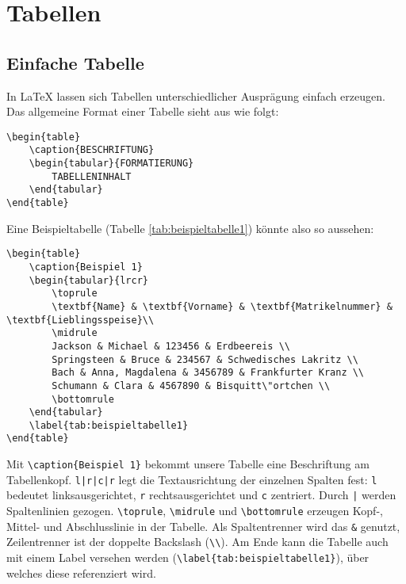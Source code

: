 
\section{Tabellen}
\label{sec:Tabellen}

\subsection{Einfache Tabelle}
In LaTeX lassen sich Tabellen unterschiedlicher Ausprägung einfach erzeugen. Das allgemeine Format einer Tabelle sieht aus wie folgt:

\begin{lstlisting}[caption={Allgemeines Format}]
\begin{table}
	\caption{BESCHRIFTUNG}
	\begin{tabular}{FORMATIERUNG}
		TABELLENINHALT
	\end{tabular}
\end{table}
\end{lstlisting}

Eine Beispieltabelle (Tabelle \ref{tab:beispieltabelle1}) könnte also so aussehen:

\begin{lstlisting}[caption={Tabelle \ref{tab:beispieltabelle1}}]
\begin{table}
	\caption{Beispiel 1}
	\begin{tabular}{lrcr}
		\toprule
		\textbf{Name} & \textbf{Vorname} & \textbf{Matrikelnummer} & \textbf{Lieblingsspeise}\\
		\midrule
		Jackson & Michael & 123456 & Erdbeereis \\
		Springsteen & Bruce & 234567 & Schwedisches Lakritz \\
		Bach & Anna, Magdalena & 3456789 & Frankfurter Kranz \\
		Schumann & Clara & 4567890 & Bisquitt\"ortchen \\
		\bottomrule
	\end{tabular}
	\label{tab:beispieltabelle1}
\end{table}
\end{lstlisting}

Mit \lstinline|\caption{Beispiel 1}| bekommt unsere Tabelle eine Beschriftung am Tabellenkopf. \lstinline{l|r|c|r} legt die Textausrichtung der einzelnen Spalten fest: \lstinline|l| bedeutet linksausgerichtet, \lstinline|r| rechtsausgerichtet und \lstinline|c| zentriert. Durch \lstinline{|} werden Spaltenlinien gezogen. \lstinline|\toprule|, \lstinline|\midrule| und \lstinline|\bottomrule| erzeugen Kopf-, Mittel- und Abschlusslinie in der Tabelle. Als Spaltentrenner wird das \lstinline{&} genutzt, Zeilentrenner ist der doppelte Backslash (\lstinline|\\|). Am Ende kann die Tabelle auch mit einem Label versehen werden (\lstinline|\label{tab:beispieltabelle1}|), über welches diese referenziert wird.

